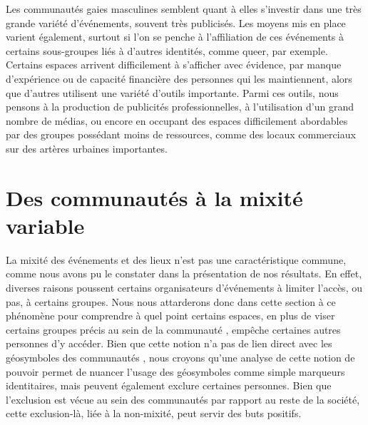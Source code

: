 Les communautés gaies masculines semblent quant à elles s'investir dans une très grande variété d'événements, souvent très publicisés. 
Les moyens mis en place varient également, surtout si l'on se penche à l'affiliation de ces événements à certains sous-groupes liés à d'autres identités, comme queer, par exemple.
Certains espaces arrivent difficilement à s'afficher avec évidence, par manque d'expérience ou de capacité financière des personnes qui les maintiennent, alors que d'autres utilisent une variété d'outils importante. 
Parmi ces outils, nous pensons à la production de publicités professionnelles, à l'utilisation d'un grand nombre de médias, ou encore en occupant des espaces difficilement abordables par des groupes possédant moins de ressources, comme des locaux commerciaux sur des artères urbaines importantes.

\section{Des communautés à la mixité variable}
La mixité des événements et des lieux \lgbt{} n'est pas une caractéristique commune, comme nous avons pu le constater dans la présentation de nos résultats.
En effet, diverses raisons poussent certains organisateurs d'événements à limiter l'accès, ou pas, à certains groupes.
Nous nous attarderons donc dans cette section à ce phénomène pour comprendre à quel point certains espaces, en plus de viser certains groupes précis au sein de la communauté \lgbt{}, empêche certaines autres personnes d'y accéder.
Bien que cette notion n'a pas de lien direct avec les géosymboles des communautés \lgbt{}, nous croyons qu'une analyse de cette notion de pouvoir permet de nuancer l'usage des géosymboles comme simple marqueurs identitaires, mais peuvent également exclure certaines personnes.
Bien que l'exclusion est vécue au sein des communautés \lgbt{} par rapport au reste de la société, cette exclusion-là, liée à la non-mixité, peut servir des buts positifs.

